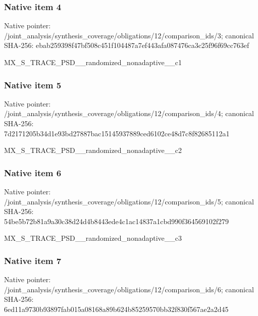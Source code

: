 \documentclass[10pt,a4paper]{article}
\begin{document}
\subsubsection{Native item 4}
Native pointer: /joint\_\allowbreak{}analysis/synthesis\_\allowbreak{}coverage/obligations/12/comparison\_\allowbreak{}ids/3; canonical SHA-256: ebab259398f47bf508c451f104487a7ef443afa087476ca3c25f96f69cc763ef

\begingroup\raggedright\sloppy MX\_\allowbreak{}S\_\allowbreak{}TRACE\_\allowbreak{}PSD\_\allowbreak{}\_\allowbreak{}randomized\_\allowbreak{}nonadaptive\_\allowbreak{}\_\allowbreak{}c1\par\endgroup

\subsubsection{Native item 5}
Native pointer: /joint\_\allowbreak{}analysis/synthesis\_\allowbreak{}coverage/obligations/12/comparison\_\allowbreak{}ids/4; canonical SHA-256: 7d2171205b34d1e93bd27887bac15145937889ced6102ce48d7c8f82685112a1

\begingroup\raggedright\sloppy MX\_\allowbreak{}S\_\allowbreak{}TRACE\_\allowbreak{}PSD\_\allowbreak{}\_\allowbreak{}randomized\_\allowbreak{}nonadaptive\_\allowbreak{}\_\allowbreak{}c2\par\endgroup

\subsubsection{Native item 6}
Native pointer: /joint\_\allowbreak{}analysis/synthesis\_\allowbreak{}coverage/obligations/12/comparison\_\allowbreak{}ids/5; canonical SHA-256: 54be5b72b81a9a30c38d24d4b8443ede4c1ac14837a1cbd990f364569102f279

\begingroup\raggedright\sloppy MX\_\allowbreak{}S\_\allowbreak{}TRACE\_\allowbreak{}PSD\_\allowbreak{}\_\allowbreak{}randomized\_\allowbreak{}nonadaptive\_\allowbreak{}\_\allowbreak{}c3\par\endgroup

\subsubsection{Native item 7}
Native pointer: /joint\_\allowbreak{}analysis/synthesis\_\allowbreak{}coverage/obligations/12/comparison\_\allowbreak{}ids/6; canonical SHA-256: 6ed11a9730b93897fab015a08168a89b624b85259570bb32f830f567ae2a2d45
\end{document}
